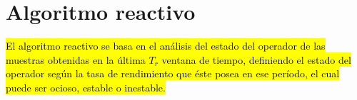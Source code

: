 


\section{Algoritmo reactivo}

\hl{El algoritmo reactivo se basa en el análisis del estado del operador de las muestras obtenidas en la última $T_r$ ventana de tiempo, definiendo el estado del operador según la tasa de rendimiento que éste posea en ese período, el cual puede ser ocioso, estable o inestable.}

